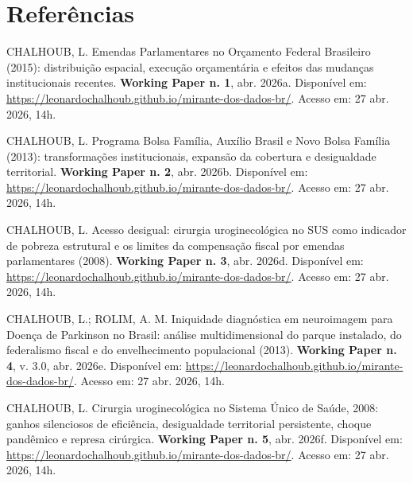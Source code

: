 \documentclass[12pt,a4paper,oneside]{article}
\begin{document}
\section*{Referências}\label{sec:ref}
\begin{singlespace}\small

\noindent\hangindent=1.25cm
CHALHOUB, L. Emendas Parlamentares no Orçamento Federal Brasileiro
(2015): distribuição espacial, execução
orçamentária e efeitos das mudanças institucionais recentes.
\textbf{Working Paper n. 1}, abr. 2026a. Disponível em:
\url{https://leonardochalhoub.github.io/mirante-dos-dados-br/}.
Acesso em: 27 abr. 2026, 14h.\par\smallskip

\noindent\hangindent=1.25cm
CHALHOUB, L. Programa Bolsa Família, Auxílio Brasil e Novo Bolsa
Família (2013): transformações institucionais,
expansão da cobertura e desigualdade territorial.
\textbf{Working Paper n. 2}, abr. 2026b. Disponível em:
\url{https://leonardochalhoub.github.io/mirante-dos-dados-br/}.
Acesso em: 27 abr. 2026, 14h.\par\smallskip

\noindent\hangindent=1.25cm
CHALHOUB, L. Acesso desigual: cirurgia uroginecológica no SUS
como indicador de pobreza estrutural e os limites da compensação
fiscal por emendas parlamentares (2008).
\textbf{Working Paper n. 3}, abr. 2026d. Disponível em:
\url{https://leonardochalhoub.github.io/mirante-dos-dados-br/}.
Acesso em: 27 abr. 2026, 14h.\par\smallskip

\noindent\hangindent=1.25cm
CHALHOUB, L.; ROLIM, A. M. Iniquidade diagnóstica em neuroimagem
para Doença de Parkinson no Brasil: análise multidimensional do
parque instalado, do federalismo fiscal e do envelhecimento
populacional (2013).
\textbf{Working Paper n. 4}, v. 3.0, abr. 2026e. Disponível em:
\url{https://leonardochalhoub.github.io/mirante-dos-dados-br/}.
Acesso em: 27 abr. 2026, 14h.\par\smallskip

\noindent\hangindent=1.25cm
CHALHOUB, L. Cirurgia uroginecológica no Sistema Único de Saúde,
2008: ganhos silenciosos de eficiência,
desigualdade territorial persistente, choque pandêmico e represa
cirúrgica. \textbf{Working Paper n. 5}, abr. 2026f. Disponível
em:
\url{https://leonardochalhoub.github.io/mirante-dos-dados-br/}.
Acesso em: 27 abr. 2026, 14h.\par\smallskip


\end{singlespace}
\end{document}
